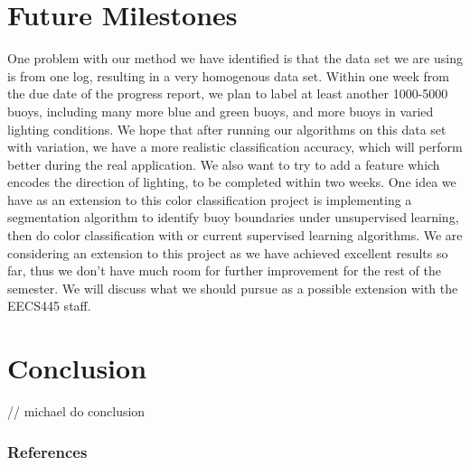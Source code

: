 \documentclass{article} %
\begin{document}
\section{Future Milestones}
One problem with our method we have identified is that the data set we are using is from one log, resulting in a very homogenous data set. Within one week from the due date of the progress report, we plan to label at least another 1000-5000 buoys, including many more blue and green buoys, and more buoys in varied lighting conditions. We hope that after running our algorithms on this data set with variation, we have a more realistic classification accuracy, which will perform better during the real application. We also want to try to add a feature which encodes the direction of lighting, to be completed within two weeks. One idea we have as an extension to this color classification project is implementing a segmentation algorithm to identify buoy boundaries under unsupervised learning, then do color classification with or current supervised learning algorithms. We are considering an extension to this project as we have achieved excellent results so far, thus we don't have much room for further improvement for the rest of the semester. We will discuss what we should pursue as a possible extension with the EECS445 staff. 
 

\section{Conclusion}

// michael do conclusion

\subsubsection*{References}


\end{document}
